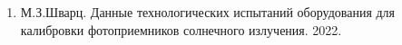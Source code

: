 \documentclass[../main.tex]{subfiles}
\begin{document}
    \begin{enumerate}
      \item М.З.Шварц. Данные технологических испытаний оборудования для калибровки фотоприемников солнечного излучения. 2022.
    \end{enumerate}
\end{document}
